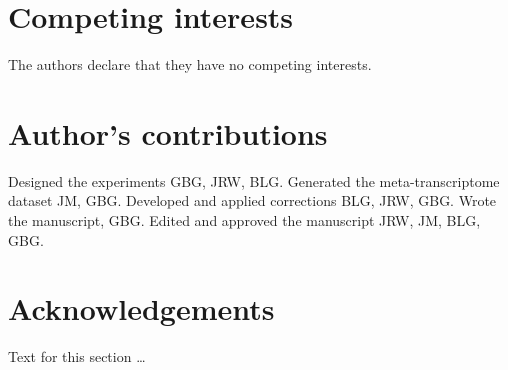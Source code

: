 \documentclass{bmcart}
\begin{document}

\begin{backmatter}

\section*{Competing interests}
  The authors declare that they have no competing interests.

\section*{Author's contributions}
    Designed the experiments GBG, JRW, BLG. Generated the meta-transcriptome dataset JM, GBG. Developed and applied corrections BLG, JRW, GBG. Wrote the manuscript, GBG. Edited and approved the manuscript JRW, JM, BLG, GBG.

\section*{Acknowledgements}
  Text for this section \ldots



\end{backmatter}
\end{document}
